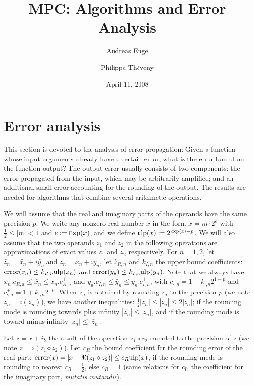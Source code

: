 \documentclass {article}
\title {MPC: Algorithms and Error Analysis}
\author {Andreas Enge \and Philippe Th\'eveny}
\date {April 11, 2008}
\DeclareMathOperator{\error}{error}
\newcommand {\Ulp}{{\rm ulp}}
\newcommand {\Exp}{{\rm \textsc exp}}
\begin{document}
\maketitle
\tableofcontents


\section {Error analysis}

This section is devoted to the analysis of error propagation: Given a function
whose input arguments already have a certain error, what is the error bound on
the function output? The output error usually consists of two components: the
error propagated from the input, which may be arbitrarily amplified; and an
additional small error accounting for the rounding of the output. The results
are needed for algorithms that combine several arithmetic operations.

We will assume that the real and imaginary parts of the operands have the same
precision $p$. We write any nonzero real number $x$ in the form $x = m \cdot
2^e$ with $\frac{1}{2} \le |m| < 1$ and $e := \Exp(x)$, and we define $\Ulp(x)
:= 2^{\Exp(x) - p}$.  We will also assume that the two operands $z_1$ and
$z_2$ in the following operations are approximations of exact values
$\widetilde{z_1}$ and $\widetilde{z_2}$ respectively. For $n=1, 2$, let
$\widetilde{z_n} = \widetilde{x_n} + i \widetilde{y_n}$ and $z_n = x_n + i
y_n$, let $k_{R,n}$ and $k_{I,n}$ the upper bound coefficients: $\error(x_n)
\leq k_{R,n} \Ulp(x_n)$ and $\error(y_n) \leq k_{I,n} \Ulp(y_n)$.  Note that
we always have $x_n.c_{R,n}^- \leq \widetilde{x_n} \leq x_n.c_{R,n}^+$ and
$y_n.c_{I,n}^- \leq \widetilde{y_n} \leq y_n.c_{I,n}^+$, with $c_{\cdot,n}^- =
1-k_{\cdot,n}2^{1-p}$ and $c_{\cdot,n}^+ = 1+k_{\cdot,n}2^{-p}$. When $z_n$ is
obtained by rounding $\widetilde{z_n}$ to the precision $p$ (we note
$z_n=\circ(\widetilde{z_n})$), we have another inequalities: $\frac{1}{2}|z_n|
\leq |\widetilde{z_n}| \leq 2|z_n|$; if the rounding mode is rounding towards
plus infinity $|\widetilde{z_n}| \leq |z_n|$, and if the rounding mode is
toward minus infinity $|z_n| \leq |\widetilde{z_n}|$.

Let $z=x+iy$ the result of the operation $z_1\diamond z_2$ rounded to the
precision of $z$ (we note $z=\circ(z_1 \diamond z_2)$). Let $c_R$ the bound
coefficient for the rounding error of the real part: $\error(x) = |x-\Re(z_1
\diamond z_2)| \leq c_R \Ulp(x)$, if the rounding mode is rounding to nearest
$c_R=\frac{1}{2}$, else $c_R=1$ (same relations for $c_I$, the coefficient for
the imaginary part, \emph{mutatis mutandis}).
\end{document}
